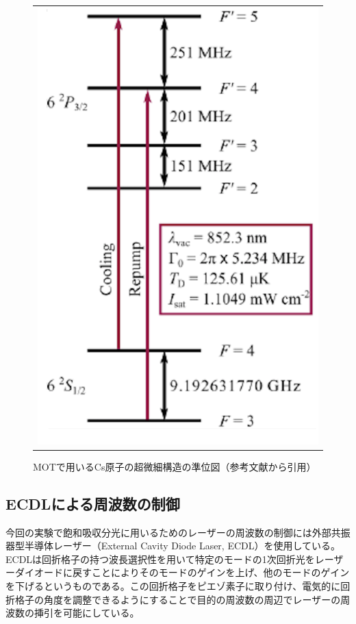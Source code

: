 \documentclass[uplatex, dvipdfmx, a4paper, report, papersize, 11pt]{jsbook}
\begin{document}
\begin{figure}[htpb]
  \centering
    \begin{tabular}{c}
      \begin{minipage}{1\hsize}
        \centering
          \includegraphics[keepaspectratio,  scale=0.35,  angle=0]
                          {figures/saturated-absorption/Cs_level_diagram_MOT.png}
                          \caption{MOTで用いるCs原子の超微細構造の準位図（参考文献\cite{Cs_level_diagram}から引用）}
                          \label{Cs_level_diagram_MOT}
      \end{minipage}
    \end{tabular}
\end{figure}
\subsection{ECDLによる周波数の制御}
今回の実験で飽和吸収分光に用いるためのレーザーの周波数の制御には外部共振器型半導体レーザー（External Cavity Diode Laser, ECDL）を使用している。ECDLは回折格子の持つ波長選択性を用いて特定のモードの1次回折光をレーザーダイオードに戻すことによりそのモードのゲインを上げ、他のモードのゲインを下げるというものである。この回折格子をピエゾ素子に取り付け、電気的に回折格子の角度を調整できるようにすることで目的の周波数の周辺でレーザーの周波数の挿引を可能にしている。
\end{document}

